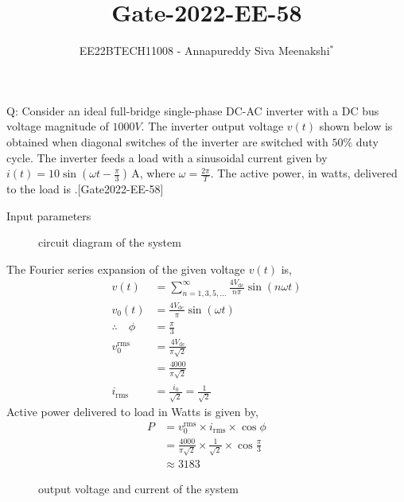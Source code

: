 \documentclass[journal,12pt,onecolumn]{IEEEtran}
\theoremstyle{remark}
\begin{document}

\vspace{3cm}

\title{Gate-2022-EE-58}
\author{EE22BTECH11008 - Annapureddy Siva Meenakshi$^{*}$}
\maketitle
\bigskip

\renewcommand{\thefigure}{\theenumi}
\renewcommand{\thetable}{\theenumi}
Q: Consider an ideal full-bridge single-phase DC-AC inverter with a DC bus voltage magnitude of $1000 V$. The inverter output voltage $v(t)$ shown below is obtained when diagonal switches of the inverter are switched with $50\%$ duty cycle. The inverter feeds a load with a sinusoidal current given by $i(t) = 10 \sin(\omega t - \frac{\pi}{3}) \, \mathrm{A}$, where $\omega=\frac{2\pi}{T}$. The active power, in watts, delivered to the load is \underline{\quad}.[Gate2022-EE-58]  \\     
\begin{figure}[htb]
  \centering
  
  \label{fig:EE_58_f1}
\end{figure}
   

\solution
\fi
\begin{table}[!ht]
    \centering
        
    \caption{Input parameters}
    \label{tab:EE_58_t1}
\end{table}

\begin{figure}[htb]
  \centering
  
   \captionsetup{justification=centering, singlelinecheck=off}
  \caption{circuit diagram of the system}
  \label{fig:EE_58_f2}
\end{figure}

The Fourier series expansion of the given voltage $v(t)$ is,
\begin{align}
  v(t) &= \sum_{n=1,3,5,\ldots}^{\infty} \frac{4V_{\text{dc}}}{n\pi} \sin(n\omega t)\\
    v_{0}(t)&=  \frac{4V_{\text{dc}}}{\pi} \sin(\omega t)\\
    \therefore \quad \phi &= \frac{\pi}{3}\\
    v_{0}^{\text{rms}}&=  \frac{4V_{\text{dc}}}{\pi \sqrt{2}}\\
    &=\frac{4000}{\pi \sqrt{2}}\\
    i_{\text{rms}}&=\frac{i_{0}}{\sqrt{2}}=\frac{1}{\sqrt{2}}
\end{align}
  Active power delivered to load in Watts is given by,
  \begin{align}
    P &= v_{0}^{\text{rms}} \times i_{\text{rms}} \times \cos{\phi}\\
    &= \frac{4000}{\pi \sqrt{2}} \times \frac{1}{\sqrt{2}} \times \cos{\frac{\pi}{3}}\\
    &\approx 3183 
\end{align}

\begin{figure}[htb]
  \centering
  
   \captionsetup{justification=centering, singlelinecheck=off}
  \caption{output voltage and current of the system}
  \label{fig:EE_58_f3}
\end{figure}

\end{document}
